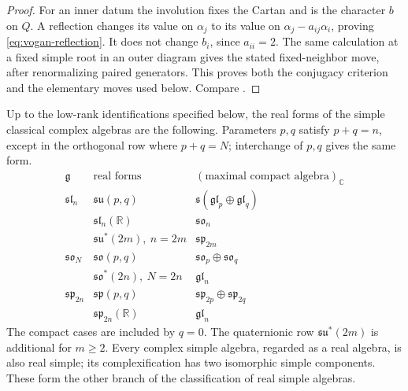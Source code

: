 \begin{proof}
For an inner datum the involution fixes the Cartan and is
the character \(b\) on \(Q\). A reflection changes its value
on \(\alpha_j\) to its value on
\(\alpha_j-a_{ij}\alpha_i\), proving
\eqref{eq:vogan-reflection}. It does not change \(b_i\), since
\(a_{ii}=2\). The same calculation at a fixed simple root in
an outer diagram gives the stated fixed-neighbor move,
after renormalizing paired generators.
This proves both the conjugacy criterion and the elementary
moves used below. Compare \cite[Lemma 42.1]{etingof}.
\end{proof}

\begin{theorem}\label{res:J07}
Up to the low-rank identifications specified below, the real forms
of the simple classical complex algebras are the following.
Parameters \(p,q\) satisfy \(p+q=n\), except in the orthogonal
row where \(p+q=N\); interchange of \(p,q\) gives the same form.
\[
\begin{array}{c|l|l}
 \mathfrak g&\text{real forms}&
       (\text{maximal compact algebra})_{\mathbb C}\\ \hline
 \mathfrak{sl}_n&
 \mathfrak{su}(p,q)&
 \mathfrak s(\mathfrak{gl}_p\oplus\mathfrak{gl}_q)\\
 &\mathfrak{sl}_n(\mathbb R)&\mathfrak{so}_n\\
 &\mathfrak{su}^*(2m),\ n=2m&
             \mathfrak{sp}_{2m}\\ \hline
 \mathfrak{so}_N&
 \mathfrak{so}(p,q)&\mathfrak{so}_p\oplus\mathfrak{so}_q\\
 &\mathfrak{so}^*(2n),\ N=2n&\mathfrak{gl}_n\\ \hline
 \mathfrak{sp}_{2n}&
 \mathfrak{sp}(p,q)&\mathfrak{sp}_{2p}\oplus\mathfrak{sp}_{2q}\\
 &\mathfrak{sp}_{2n}(\mathbb R)&\mathfrak{gl}_n
\end{array}
\]
The compact cases are included by \(q=0\).
The quaternionic row \(\mathfrak{su}^*(2m)\) is additional for
\(m\geq2\).
Every complex simple algebra, regarded as a real algebra, is
also real simple; its complexification has two isomorphic
simple components. These form the other branch of the
classification of real simple algebras.
\end{theorem}
